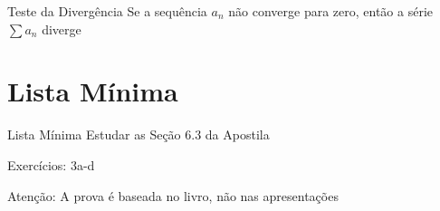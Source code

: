 \documentclass[fleqn,utf8,aspectratio=169,12pt]{beamer}
\begin{document}
\begin{frame}{Teste da Divergência}
  Se a sequência $a_n$ não converge para zero, então a série $\sum a_n$ diverge
\end{frame}



\section{Lista Mínima}

\begin{frame}{Lista Mínima}
  Estudar as Seção 6.3 da Apostila

  \vspace{\baselineskip}
  Exercícios: 3a-d

  \vfill
  Atenção: A prova é baseada no livro, não nas apresentações
\end{frame}

\end{document}
